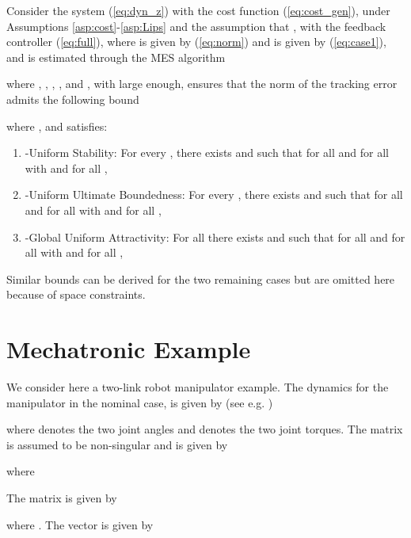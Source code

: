 \documentclass[twoside,leqno,onecolumn]{article}
\begin{document}
\begin{lemma}
Consider the system (\ref{eq:dyn_z}) with the cost function
(\ref{eq:cost_gen}), under Assumptions
\ref{asp:cost}-\ref{asp:Lips} and the assumption that , with the feedback controller
(\ref{eq:full}), where  is given by (\ref{eq:norm}) and 
is given by (\ref{eq:case1}), and  is
estimated through the MES algorithm

where , , ,
, and , with 
large enough, ensures that the norm of the tracking error admits
the following bound

where ,  and
 satisfies:
\begin{enumerate}
\item -Uniform Stability: For every
, there exists  and
 such that for all  and for all
 with  and for
all ,

\item -Uniform Ultimate Boundedness: For
every , there exists  and
 such that for all  and for all
 with  and for
all ,

\item -Global Uniform Attractivity: For all
 there exists  and
 such that for all  and for all
 with  and for
all ,

\end{enumerate}
\end{lemma}




Similar bounds can be derived for the two remaining cases but are
omitted here because of space constraints.















\section{Mechatronic Example}
\label{sec:sim}

We consider here a two-link robot manipulator example. The
dynamics for the manipulator in the nominal case, is given by (see
e.g. \cite{Spong92})

where  denotes the two joint angles and  denotes the two joint torques. The matrix
 is assumed to be non-singular and is given by

where

The matrix  is given by

where . The vector  is given by
\end{document}
